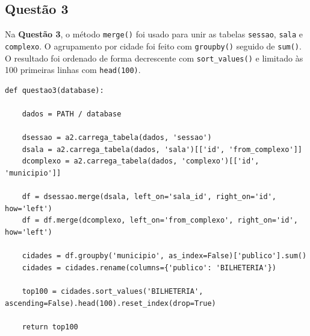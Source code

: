 \documentclass{article}
\begin{document}
\linespread{1.5}
\pagebreak
\subsection*{Questão 3}
Na \textbf{Questão 3}, o método \texttt{merge()} foi usado para unir as tabelas \texttt{sessao}, \texttt{sala} e \texttt{complexo}. O agrupamento por cidade foi feito com \texttt{groupby()} seguido de \texttt{sum()}. O resultado foi ordenado de forma decrescente com \texttt{sort\_values()} e limitado às 100 primeiras linhas com \texttt{head(100)}.
\linespread{1}
\begin{lstlisting}
def questao3(database):

    dados = PATH / database
    
    dsessao = a2.carrega_tabela(dados, 'sessao')
    dsala = a2.carrega_tabela(dados, 'sala')[['id', 'from_complexo']]
    dcomplexo = a2.carrega_tabela(dados, 'complexo')[['id', 'municipio']]

    df = dsessao.merge(dsala, left_on='sala_id', right_on='id', how='left')
    df = df.merge(dcomplexo, left_on='from_complexo', right_on='id', how='left')

    cidades = df.groupby('municipio', as_index=False)['publico'].sum()
    cidades = cidades.rename(columns={'publico': 'BILHETERIA'})

    top100 = cidades.sort_values('BILHETERIA', ascending=False).head(100).reset_index(drop=True)

    return top100

\end{lstlisting}
\linespread{1.5}
\end{document}

